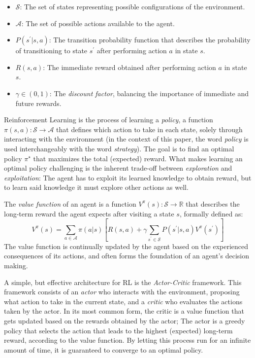 \documentclass[sigconf]{acmart}
\begin{document}
\begin{itemize}
    \item $\mathcal{S}$: The set of states representing possible configurations of the environment.
    \item $\mathcal{A}$: The set of possible actions available to the agent.
    \item $P(s^\prime | s, a)$: The transition probability function that describes the probability of transitioning to state $s^\prime$ after performing action $a$ in state $s$.
    \item $R(s, a)$: The immediate reward obtained after performing action $a$ in state $s$.
    \item $\gamma \in (0, 1)$: The \textit{discount factor}, balancing the importance of immediate and future rewards.
\end{itemize}

Reinforcement Learning is the process of learning a \textit{policy}, a function $\pi(s, a): \mathcal{S} \rightarrow \mathcal{A}$ that defines which action to take in each state, solely through interacting with the environment (in the context of this paper, the word \textit{policy} is used interchangeably with the word \textit{strategy}).
The goal is to find an optimal policy $\pi^\star$ that maximizes the total (expected) reward\cite{Cheng2025}.
What makes learning an optimal policy challenging is the inherent trade-off between \textit{exploration} and \textit{exploitation}: The agent has to exploit its learned knowledge to obtain reward, but to learn said knowledge it must explore other actions as well\cite{andrew2018reinforcement}.

The \textit{value function} of an agent is a function $V^\pi(s): \mathcal{S} \rightarrow \mathbb{R}$ that describes the long-term reward the agent expects after visiting a state $s$, formally defined as: \cite{Cheng2025,andrew2018reinforcement}
\begin{equation}
    V^\pi(s) = \sum_{a \in \mathcal{A}} \pi(a | s) \left[ R(s, a) + \gamma \sum_{s^\prime \in \mathcal{S}} P(s^\prime | s, a) V^\pi(s^\prime) \right]
\end{equation}
The value function is continually updated by the agent based on the experienced consequences of its actions, and often forms the foundation of an agent's decision making\cite{andrew2018reinforcement}.

A simple, but effective architecture for RL is the \textit{Actor-Critic} framework.
This framework consists of an \textit{actor} who interacts with the environment, proposing what action to take in the current state, and a \textit{critic} who evaluates the actions taken by the actor\cite{konda1999actor}.
In its most common form, the critic is a value function that gets updated based on the rewards obtained by the actor; The actor is a greedy policy that selects the action that leads to the highest (expected) long-term reward, according to the value function.
By letting this process run for an infinite amount of time, it is guaranteed to converge to an optimal policy\cite{konda1999actor}.
\end{document}
